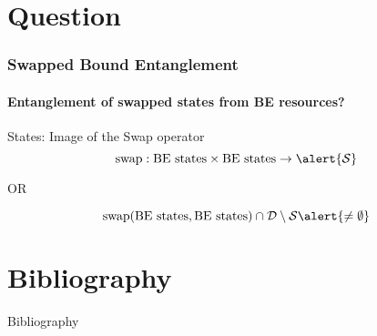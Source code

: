 \documentclass[compress,notes=hide]{beamer}
\begin{document}
\section{Question}



\begin{frame}
\frametitle{Swapped Bound Entanglement}
\framesubtitle{Entanglement of swapped states from BE resources?}

\begin{block}{States: Image of the Swap operator}
	\[ \swap: \text{BE states} \times \text{BE states} \to \alert{\S} \]
	\centerline{OR}
	\[ \swap(\text{BE states},\text{BE states}) \cap  \mathcal{D}\setminus\S\alert{\neq \emptyset}\]
\end{block}

\end{frame}


\section*{Bibliography}

\begin{frame}[allowframebreaks]{Bibliography}




\end{frame}
\end{document}
